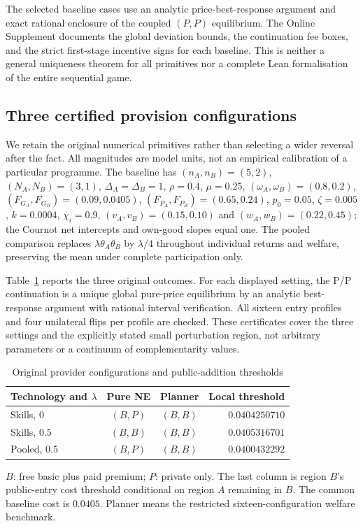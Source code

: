 The selected baseline cases use an analytic price-best-response argument and exact rational enclosure of the coupled $(P,P)$ equilibrium. The Online Supplement documents the global deviation bounds, the continuation fee boxes, and the strict first-stage incentive signs for each baseline. This is neither a general uniqueness theorem for all primitives nor a complete Lean formalisation of the entire sequential game.

\subsection{Three certified provision configurations}
We retain the original numerical primitives rather than selecting a wider reversal after the fact.
All magnitudes are model units, not an empirical calibration of a particular programme.
The baseline has $(n_A,n_B)=(5,2)$, $(N_A,N_B)=(3,1)$, $\Delta_A=\Delta_B=1$, $\rho=0.4$, $\mu=0.25$, $(\omega_A,\omega_B)=(0.8,0.2)$, $(F_{G_A},F_{G_B})=(0.09,0.0405)$, $(F_{P_A},F_{P_B})=(0.65,0.24)$, $p_0=0.05$, $\zeta=0.005$, $k=0.0004$, $\chi_i=0.9$, $(v_A,v_B)=(0.15,0.10)$ and $(w_A,w_B)=(0.22,0.45)$; the Cournot net intercepts and own-good slopes equal one.
The pooled comparison replaces $\lambda\theta_A\theta_B$ by $\lambda/4$ throughout individual returns and welfare, preserving the mean under complete participation only.

Table~\ref{tab:entry} reports the three original outcomes.
For each displayed setting, the P/P continuation is a unique global pure-price equilibrium by an analytic best-response argument with rational interval verification.
All sixteen entry profiles and four unilateral flips per profile are checked.
These certificates cover the three settings and the explicitly stated small perturbation region, not arbitrary parameters or a continuum of complementarity values.

\begin{table}[htbp]\centering
\caption{Original provider configurations and public-addition thresholds}\label{tab:entry}
\begin{tabular}{@{}lccr@{}}\toprule
Technology and $\lambda$ & Pure NE & Planner & Local threshold\\\midrule
Skills, $0$ & $(B,P)$ & $(B,B)$ & $0.0404250710$\\
Skills, $0.5$ & $(B,B)$ & $(B,B)$ & $0.0405316701$\\
Pooled, $0.5$ & $(B,P)$ & $(B,B)$ & $0.0400432292$\\\bottomrule
\end{tabular}
\par\smallskip\footnotesize $B$: free basic plus paid premium; $P$: private only. The last column is region $B$'s public-entry cost threshold conditional on region $A$ remaining in $B$. The common baseline cost is $0.0405$. Planner means the restricted sixteen-configuration welfare benchmark.
\end{table}
